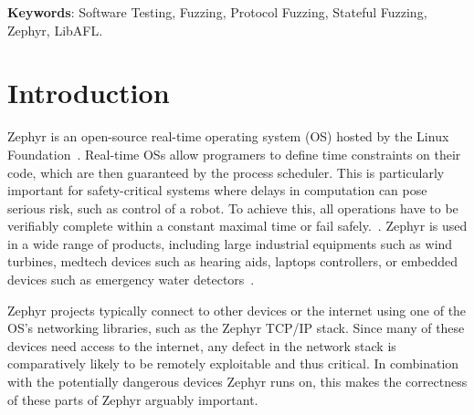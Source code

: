 \documentclass[twocolumn]{article}
\let\savedCite=\cite
\renewcommand{\cite}{\unskip~\savedCite}
\begin{document}
\clearpage\newpage
\onecolumn
\begin{center}
  \begin{minipage}{0.8\textwidth}
    \vspace{70px}
    \begin{abstract}
      \lipsum[1]\lipsum[2]\lipsum[3]
    \end{abstract}
  \end{minipage}
  \vspace{70px}

  \begin{minipage}{0.7\textwidth}
    \textbf{Keywords}: Software Testing, Fuzzing, Protocol Fuzzing, Stateful Fuzzing, Zephyr, LibAFL.
  \end{minipage}
\end{center}

\clearpage\newpage
\onecolumn

\tableofcontents
\clearpage\newpage
\twocolumn
{}


\section{Introduction}
\label{Introduction}

Zephyr is an open-source real-time operating system (OS) hosted by the Linux Foundation\cite{ZephyrAbout}. Real-time OSs allow programers to define time constraints on their code, which are then guaranteed by the process scheduler. This is particularly important for safety-critical systems where delays in computation can pose serious risk, such as control of a robot. To achieve this, all operations have to be verifiably complete within a constant maximal time or fail safely.\cite{RTOSWiki}. Zephyr is used in a wide range of products, including large industrial equipments such as wind turbines, medtech devices such as hearing aids, laptops controllers, or embedded devices such as emergency water detectors\cite{ZephyrUsedIn}.

Zephyr projects typically connect to other devices or the internet using one of the OS's networking libraries, such as the Zephyr TCP/IP stack. Since many of these devices need access to the internet, any defect in the network stack is comparatively likely to be remotely exploitable and thus critical. In combination with the potentially dangerous devices Zephyr runs on, this makes the correctness of these parts of Zephyr arguably important.
\end{document}
